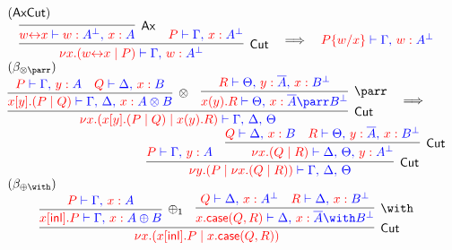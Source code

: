 \begin{figure*}
\[\colored
\begin{array}{c}
\multicolumn{1}{l}{(\Ax\Cut)} \\ %
\vcenter{
  \inference{
    \inference{
    }{Ax}{
      \tm{w \link x} \tpvdash \tp{\tmof{w}\dualbt{A} \comma \tmof{x}A}
    }
    &
    \tm{P} \tpvdash \tp{\Gamma \comma \tmof{x}\dualbt{A}}
  }{Cut}{
   \tm{\nu x \Of{A}.(w \link x \mid P)} \tpvdash
     \tp{\Gamma \comma \tmof{w}\dualbt{A}}
 }
}
\quad \becomes \quad
\tm{P\sub{w/x}} \tpvdash  \tp{\Gamma \comma \tmof{w}A^\bot}
\\
\multicolumn{1}{l}{(\beta_{\otimes\parr})}\filler \\ %
\vcenter{
  \inference{
    \inference{
      \tm{P} \tpvdash \tp{\Gamma \comma \tmof{y}A}
      &
      \tm{Q} \tpvdash \tp{\Delta \comma \tmof{x}B}
    }{\otimes}{
      \tm{x[y].(P \mid Q)} \tpvdash
        \tp{\Gamma \comma \Delta \comma \tmof{x}A \otimes B}
    } 
    &
    \inference{
      \tm{R} \tpvdash
        \tp{\Theta \comma \tmof{y}\dual{A} \comma \tmof{x}\dualbt{B}}
    }{\parr}{
      \tm{x(y).R} \tpvdash
        \tp{\Theta \comma \tmof{x}\dual{A} \parr \dualbt{B}}
    } 
  }{Cut}{
    \tm{\nu x\Of{A \otimes B}.(x[y].(P \mid Q) \mid x(y).R)} \tpvdash
      \tp{\Gamma \comma \Delta \comma \Theta}
  }
}  \quad \becomes \hfill
\\
\hfill
\vcenter{
  \inference{
      \tm{P} \tpvdash \tp{\Gamma \comma \tmof{y}A}
      &
      \inference{
        \tm{Q} \tpvdash \tp{\Delta \comma \tmof{x}B}
        &
        \tm{R} \tpvdash
          \tp{\Theta \comma \tmof{y}\dual{A} \comma \tmof{x}\dualbt{B}}
      }{Cut}{
        \tm{\nu x \Of{B}.(Q \mid R)} \tpvdash
          \tp{\Delta \comma \Theta \comma \tmof{y}\dualbt{A}}
      }
    }{Cut}{
      \tm{\nu y \Of{A}.(P \mid \nu x.(Q \mid R))} \tpvdash
         \tp{\Gamma \comma \Delta \comma \Theta}
    }
  }
\\
\multicolumn{1}{l}{(\beta_{\oplus\with})} \\ %
\vcenter{
  \inference{
    \inference{
      \tm{P} \tpvdash \tp{\Gamma \comma \tmof{x}A}
    }{\oplus_1}{
      \tm{x[\inlterm].P} \tpvdash \tp{\Gamma \comma \tmof{x}A \oplus B}
    } 
    &
    \inference{
      \tm{Q} \tpvdash \tp{\Delta \comma \tmof{x}\dualbt{A}}
      &
      \tm{R} \tpvdash \tp{\Delta \comma \tmof{x}\dualbt{B}}
    }{\with}{
      \tm{x.\caseterm(Q,R)} \tpvdash
        \tp{\Delta \comma \tmof{x}\dual{A} \with \dualbt{B}}
    } 
  }{Cut}{
    \tm{\nu x \Of{A \oplus B}.(x[\inlterm].P \mid x.\caseterm(Q,R))}
}}
\end{array}\]
\end{figure*}
